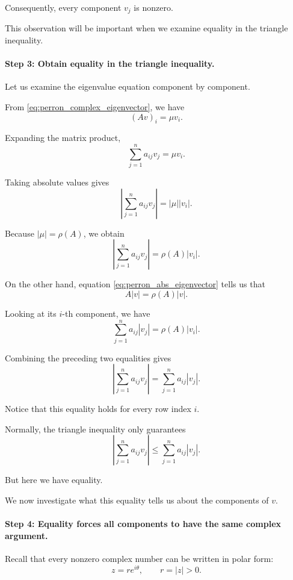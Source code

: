 \documentclass[11pt,a4paper]{article}
\theoremstyle{definition}
\theoremstyle{remark}
\begin{document}
Consequently, every component $v_j$
is nonzero.

This observation will be important
when we examine equality in the
triangle inequality.


\paragraph{Step 3: Obtain equality
in the triangle inequality.}

Let us examine the eigenvalue equation
component by component.

From
\eqref{eq:perron_complex_eigenvector},
we have
\[
(Av)_i=\mu v_i.
\]

Expanding the matrix product,
\[
\sum_{j=1}^{n}a_{ij}v_j
=
\mu v_i.
\]

Taking absolute values gives
\begin{equation}
\left|
\sum_{j=1}^{n}a_{ij}v_j
\right|
=
|\mu||v_i|.
\label{eq:perron_abs_component}
\end{equation}

Because $|\mu|=\rho(A)$,
we obtain
\[
\left|
\sum_{j=1}^{n}a_{ij}v_j
\right|
=
\rho(A)|v_i|.
\]

On the other hand, equation
\eqref{eq:perron_abs_eigenvector}
tells us that
\[
A|v|=\rho(A)|v|.
\]

Looking at its $i$-th component,
we have
\[
\sum_{j=1}^{n}a_{ij}|v_j|
=
\rho(A)|v_i|.
\]

Combining the preceding two
equalities gives
\begin{equation}
\boxed{
\left|
\sum_{j=1}^{n}a_{ij}v_j
\right|
=
\sum_{j=1}^{n}a_{ij}|v_j|.
}
\label{eq:perron_triangle_equality}
\end{equation}

Notice that this equality holds
for every row index $i$.

Normally, the triangle inequality
only guarantees
\[
\left|
\sum_{j=1}^{n}a_{ij}v_j
\right|
\leq
\sum_{j=1}^{n}a_{ij}|v_j|.
\]

But here we have equality.

We now investigate what this
equality tells us about the
components of $v$.


\paragraph{Step 4: Equality forces
all components to have the same
complex argument.}

Recall that every nonzero complex
number can be written in polar form:
\[
z=re^{i\theta},
\qquad r=|z|>0.
\]
\end{document}
